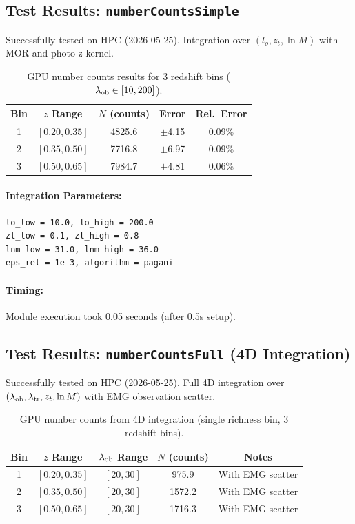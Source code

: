 \documentclass[a4paper, 11pt]{article}
\begin{document}
\subsection{Test Results: \texttt{numberCountsSimple}}

Successfully tested on HPC (2026-05-25). Integration over $(l_o, z_t, \ln M)$ with MOR and photo-z kernel.

\begin{table}[H]
\centering
\begin{tabular}{@{}c c c c c@{}}
\toprule
Bin & $z$ Range & $N$ (counts) & Error & Rel.\ Error \\
\midrule
1 & $[0.20, 0.35]$ & 4825.6 & $\pm$4.15 & 0.09\% \\
2 & $[0.35, 0.50]$ & 7716.8 & $\pm$6.97 & 0.09\% \\
3 & $[0.50, 0.65]$ & 7984.7 & $\pm$4.81 & 0.06\% \\
\bottomrule
\end{tabular}
\caption{GPU number counts results for 3 redshift bins ($\lambda_{\rm ob} \in [10, 200]$).}
\end{table}

\paragraph{Integration Parameters:}
\begin{lstlisting}[language=bash]
lo_low = 10.0, lo_high = 200.0
zt_low = 0.1, zt_high = 0.8
lnm_low = 31.0, lnm_high = 36.0
eps_rel = 1e-3, algorithm = pagani
\end{lstlisting}

\paragraph{Timing:} Module execution took 0.05 seconds (after 0.5s setup).

\subsection{Test Results: \texttt{numberCountsFull} (4D Integration)}

Successfully tested on HPC (2026-05-25). Full 4D integration over $(\lambda_{\rm ob}, \lambda_{\rm tr}, z_t, \ln M)$ with EMG observation scatter.

\begin{table}[H]
\centering
\begin{tabular}{@{}c c c c c@{}}
\toprule
Bin & $z$ Range & $\lambda_{\rm ob}$ Range & $N$ (counts) & Notes \\
\midrule
1 & $[0.20, 0.35]$ & $[20, 30]$ & 975.9 & With EMG scatter \\
2 & $[0.35, 0.50]$ & $[20, 30]$ & 1572.2 & With EMG scatter \\
3 & $[0.50, 0.65]$ & $[20, 30]$ & 1716.3 & With EMG scatter \\
\bottomrule
\end{tabular}
\caption{GPU number counts from 4D integration (single richness bin, 3 redshift bins).}
\end{table}
\end{document}

